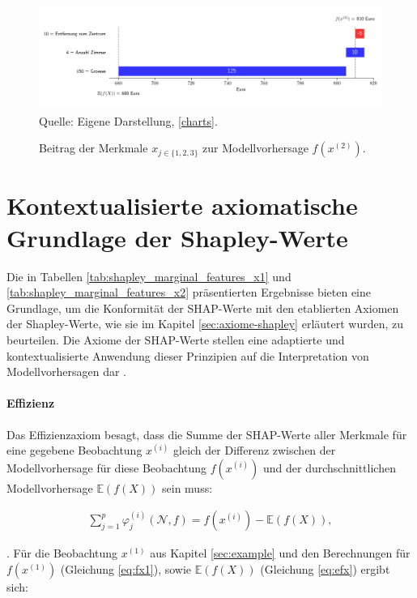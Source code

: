 \begin{figure}[!h]
    \caption{Beitrag der Merkmale $x_{j \in \{1, 2, 3\}}$ zur Modellvorhersage $f(x^{(2)})$.}
    \includegraphics[width=1\textwidth]{../scripts/images/model-output-x2.png}
    Quelle: Eigene Darstellung, \ref{charts}.
    \label{pic:model-fx2}
\end{figure}


\section{Kontextualisierte axiomatische Grundlage der Shapley-Werte}

Die in Tabellen \ref{tab:shapley_marginal_features_x1} und \ref{tab:shapley_marginal_features_x2} präsentierten Ergebnisse bieten eine Grundlage, 
um die Konformität der SHAP-Werte mit den etablierten Axiomen der Shapley-Werte, wie sie im 
Kapitel \ref{sec:axiome-shapley} erläutert wurden, zu beurteilen. Die Axiome der SHAP-Werte stellen 
eine adaptierte und kontextualisierte Anwendung dieser Prinzipien auf die Interpretation von 
Modellvorhersagen dar \cite[S. 16f]{Algaba2019HandbookOT}.


\paragraph{Effizienz}

Das Effizienzaxiom besagt, dass die Summe der SHAP-Werte aller Merkmale für eine gegebene Beobachtung $x^{(i)}$ 
gleich der Differenz zwischen der Modellvorhersage für diese Beobachtung $f(x^{(i)})$ 
und der durchschnittlichen Modellvorhersage $\mathbb{E}(f(X))$ sein muss:

\begin{align}
    \sum_{j=1}^{p}\varphi_j^{(i)}(\mathcal{N}, f) = f(x^{(i)}) - \mathbb{E}(f(X)),
    \label{eq:eff}
\end{align}

\cite[S. 221]{Molnar_2022}. Für die Beobachtung $x^{(1)}$ aus Kapitel \ref{sec:example} und den Berechnungen 
für $f(x^{(1)})$ (Gleichung \ref{eq:fx1}), sowie $\mathbb{E}(f(X))$ (Gleichung \ref{eq:efx}) ergibt sich:

